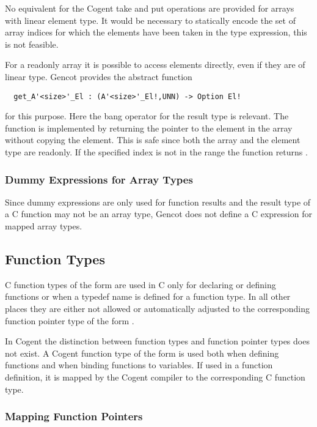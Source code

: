 No equivalent for the Cogent take and put operations are provided for arrays with linear element type. It would be
necessary to statically encode the set of array indices for which the elements have been taken in the type expression,
this is not feasible.

For a readonly array it is possible to access elements directly, even if they are of linear type. Gencot provides
the abstract function
\begin{verbatim}
  get_A'<size>'_El : (A'<size>'_El!,UNN) -> Option El!
\end{verbatim}
for this purpose. Here the bang operator for the result type is relevant. The function is implemented by returning
the pointer to the element in the array without copying the element. This is safe since both the array and the element
type are readonly. If the specified index is not in the range  the function returns .

\subsubsection{Dummy Expressions for Array Types}

Since dummy expressions are only used for function results and the result type of a C function may not be an array 
type, Gencot does not define a C expression for mapped array types.

\subsection{Function Types}
\label{design-types-function}

C function types of the form  are used in C only for declaring or defining functions or
when a typedef name is defined for a function type. In all other
places they are either not allowed or automatically adjusted to the corresponding function pointer type
of the form . 

In Cogent the distinction between function types and function pointer types does not exist. 
A Cogent function type of the form  is used both when
defining functions and when binding functions to variables. If used in a function definition, it is mapped by
the Cogent compiler to the corresponding C function type.

\subsubsection{Mapping Function Pointers}

